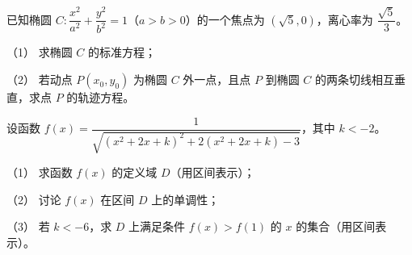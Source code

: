 \begin{question}
已知椭圆 $C:\dfrac{x^2}{a^2}+\dfrac{y^2}{b^2}=1$（$a>b>0$）的一个焦点为 $(\sqrt5,0)$，离心率为 $\dfrac{\sqrt5}{3}$。

（1） 求椭圆 $C$ 的标准方程；

（2） 若动点 $P(x_0,y_0)$ 为椭圆 $C$ 外一点，且点 $P$ 到椭圆 $C$ 的两条切线相互垂直，求点 $P$ 的轨迹方程。

\end{question}
\begin{question}
设函数 $f(x)=\dfrac1{\sqrt{(x^2+2x+k)^2+2(x^2+2x+k)-3}}$，其中 $k<-2$。

（1） 求函数 $f(x)$ 的定义域 $D$（用区间表示）；

（2） 讨论 $f(x)$ 在区间 $D$ 上的单调性；

（3） 若 $k<-6$，求 $D$ 上满足条件 $f(x)>f(1)$ 的 $x$ 的集合（用区间表示）。

\end{question}